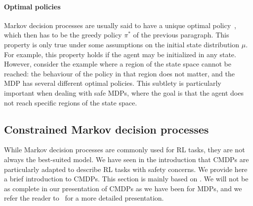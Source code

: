 			\paragraph{Optimal policies} Markov decision processes are usually said to have a unique optimal policy~\cite{sutton2018reinforcement}, which then has to be the greedy policy $\pi^*$ of the previous paragraph. This property is only true under some assumptions on the initial state distribution $\mu$. For example, this property holds if the agent may be initialized in any state. However, consider the example where a region of the state space cannot be reached: the behaviour of the policy in that region does not matter, and the MDP has several different optimal policies. This subtlety is particularly important when dealing with safe MDPs, where the goal is that the agent does not reach specific regions of the state space.
	
		\subsection{Constrained Markov decision processes} \label{sec:cmdps preliminaries}
		While Markov decision processes are commonly used for RL tasks, they are not always the best-suited model. We have seen in the introduction that CMDPs are particularly adapted to describe RL tasks with safety concerns. We provide here a brief introduction to CMDPs. This section is mainly based on \cite[Chapter\,3]{altman1999constrained}. We will not be as complete in our presentation of CMDPs as we have been for MDPs, and we refer the reader to~\cite{altman1999constrained} for a more detailed presentation.
